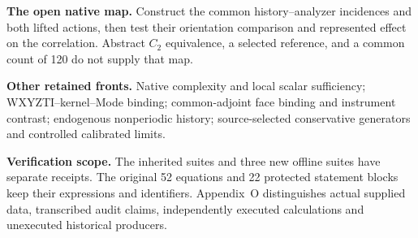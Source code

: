 \normalsize

\medskip
\noindent\textbf{The open native map.} Construct the common history--analyzer incidences and both lifted actions, then test their orientation comparison and represented effect on the correlation. Abstract $C_2$ equivalence, a selected reference, and a common count of 120 do not supply that map.

\medskip
\noindent\textbf{Other retained fronts.} Native complexity and local scalar sufficiency; WXYZTI--kernel--Mode binding; common-adjoint face binding and instrument contrast; endogenous nonperiodic history; source-selected conservative generators and controlled calibrated limits.

\medskip
\noindent\textbf{Verification scope.} The inherited suites and three new offline suites have separate receipts. The original 52 equations and 22 protected statement blocks keep their expressions and identifiers. Appendix~O distinguishes actual supplied data, transcribed audit claims, independently executed calculations and unexecuted historical producers.

